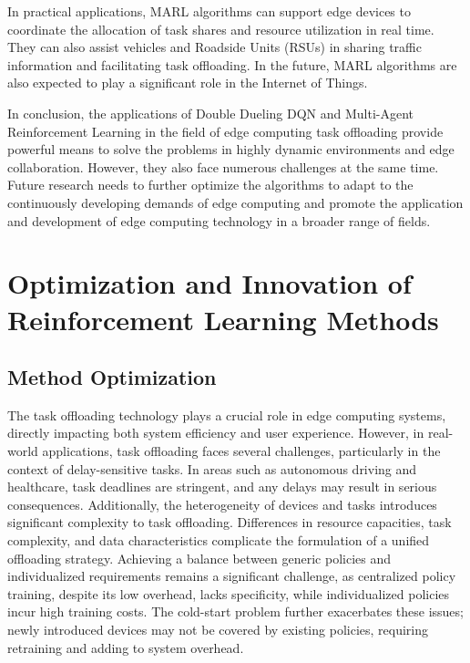 \documentclass[journal]{IEEEtran}
\begin{document}
In practical applications, MARL algorithms can support edge devices to coordinate the allocation of task shares and resource utilization in real time. They can also assist vehicles and Roadside Units (RSUs) in sharing traffic information and facilitating task offloading. In the future, MARL algorithms are also expected to play a significant role in the Internet of Things.

In conclusion, the applications of Double Dueling DQN and Multi-Agent Reinforcement Learning in the field of edge computing task offloading provide powerful means to solve the problems in highly dynamic environments and edge collaboration. However, they also face numerous challenges at the same time. Future research needs to further optimize the algorithms to adapt to the continuously developing demands of edge computing and promote the application and development of edge computing technology in a broader range of fields.


\section{Optimization and Innovation of Reinforcement Learning Methods}

\subsection{Method Optimization}

The task offloading technology plays a crucial role in edge computing systems, directly impacting both system efficiency and user experience. However, in real-world applications, task offloading faces several challenges, particularly in the context of delay-sensitive tasks. In areas such as autonomous driving and healthcare, task deadlines are stringent, and any delays may result in serious consequences. Additionally, the heterogeneity of devices and tasks introduces significant complexity to task offloading. Differences in resource capacities, task complexity, and data characteristics complicate the formulation of a unified offloading strategy. Achieving a balance between generic policies and individualized requirements remains a significant challenge, as centralized policy training, despite its low overhead, lacks specificity, while individualized policies incur high training costs. The cold-start problem further exacerbates these issues; newly introduced devices may not be covered by existing policies, requiring retraining and adding to system overhead.
\end{document}
